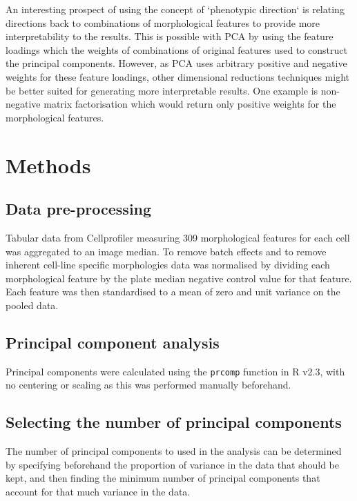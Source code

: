 \documentclass[a4paper,11pt,twoside,openright]{scrbook}
\begin{document}
An interesting prospect of using the concept of `phenotypic direction` is relating directions back to combinations of morphological features to provide more interpretability to the results.
This is possible with PCA by using the feature loadings which the weights of combinations of original features used to construct the principal components.
However, as PCA uses arbitrary positive and negative weights for these feature loadings, other dimensional reductions techniques might be better suited for generating more interpretable results.
One example is non-negative matrix factorisation which would return only positive weights for the morphological features.






\section{Methods}

\subsection{Data pre-processing}
Tabular data from Cellprofiler measuring 309 morphological features for each cell was aggregated to an image median.
To remove batch effects and to remove inherent cell-line specific morphologies data was normalised by dividing each morphological feature by the plate median negative control value for that feature.
Each feature was then standardised to a mean of zero and unit variance on the pooled data.

\subsection{Principal component analysis}

Principal components were calculated using the \texttt{prcomp} function in R v2.3, with no centering or scaling as this was performed manually beforehand.

\subsection{Selecting the number of principal components}
The number of principal components to used in the analysis can be determined by specifying beforehand the proportion of variance in the data that should be kept, and then finding the minimum number of principal components that account for that much variance in the data.
\end{document}
